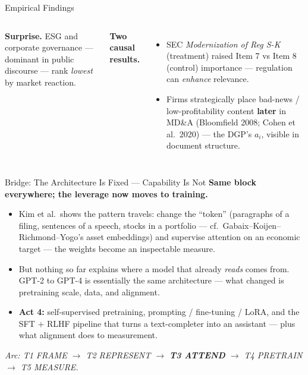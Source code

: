 \begin{frame}{Empirical Findings}
\begin{columns}[T]
\smallskip
\begin{tcolorbox}[colback=LightGray, colframe=RedTitle, boxrule=0.3mm, arc=1mm, left=2mm, right=2mm, top=0.8mm, bottom=0.8mm]
\textbf{Surprise.} ESG and corporate governance --- dominant in public discourse --- rank \emph{lowest} by market reaction.
\end{tcolorbox}

\smallskip
\textbf{Two causal results.}
\begin{itemize}
\item SEC \emph{Modernization of Reg S-K} (treatment) raised Item 7 vs Item 8 (control) importance --- regulation can \emph{enhance} relevance.
\item Firms strategically place bad-news / low-profitability content \textbf{later} in MD\&A (Bloomfield 2008; Cohen et al.\ 2020) --- the DGP's $a_i$, visible in document structure.
\end{itemize}
\end{columns}
\end{frame}

\begin{frame}{Bridge: The Architecture Is Fixed --- Capability Is Not}
\textbf{Same block everywhere; the leverage now moves to training.}
\begin{itemize}
\item Kim et al.\ shows the pattern travels: change the ``token'' (paragraphs of a filing, sentences of a speech, stocks in a portfolio --- cf.\ Gabaix--Koijen--Richmond--Yogo's asset embeddings) and supervise attention on an economic target --- the weights become an inspectable measure.
\item But nothing so far explains where a model that already \emph{reads} comes from. GPT-2 to GPT-4 is essentially the same architecture --- what changed is pretraining scale, data, and alignment.
\item \textbf{Act 4:} self-supervised pretraining, prompting / fine-tuning / LoRA, and the SFT $+$ RLHF pipeline that turns a text-completer into an assistant --- plus what alignment does to measurement.
\end{itemize}
\bigskip
\centering\footnotesize\textit{Arc: T1 FRAME $\to$ T2 REPRESENT $\to$ \textbf{T3 ATTEND} $\to$ T4 PRETRAIN $\to$ T5 MEASURE.}
\end{frame}


